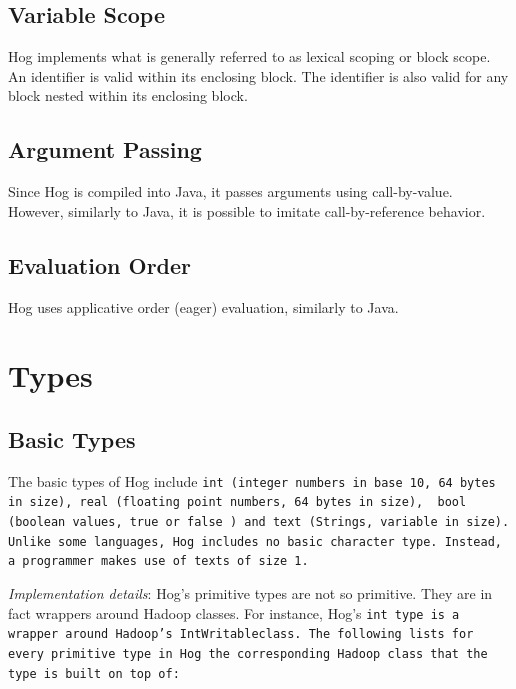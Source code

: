 \documentclass{report}
\begin{document}

\subsection{Variable Scope} %
\label{sub:variable_scope}

Hog implements what is generally referred to as lexical scoping or block scope. An
identifier is valid within its enclosing block. The identifier is also valid for
any block nested within its enclosing block.



\subsection{Argument Passing}
\label{sub:argument_passing}

Since Hog is compiled into Java, it passes arguments using call-by-value.
However, similarly to Java, it is possible to imitate call-by-reference
behavior. 

\subsection{Evaluation Order}
\label{sub:evaluation_order}

Hog uses applicative order (eager) evaluation, similarly to Java.



\section{Types} %
\label{sec:types}

\subsection{Basic Types} %
\label{sub:basic_types}

The basic types of Hog include \tt int \rm (integer numbers in base 10, 64
bytes in size), \tt real \rm (floating point numbers, 64 bytes in size), \tt
bool \rm(boolean values, \tt true \rm or \tt false \rm) and \tt text \rm
(Strings, variable in size).  Unlike some languages, Hog includes no basic
character type. Instead, a programmer makes use of \tt text\rm s of size 1.

\emph{Implementation details}: Hog’s primitive types are not so primitive. They are
in fact wrappers around Hadoop classes. For instance, Hog’s \tt int \rm type is a
wrapper around Hadoop's \tt IntWritableclass\rm. The following lists for every
primitive type in Hog the corresponding Hadoop class that the type is built on top
of:
\end{document}
